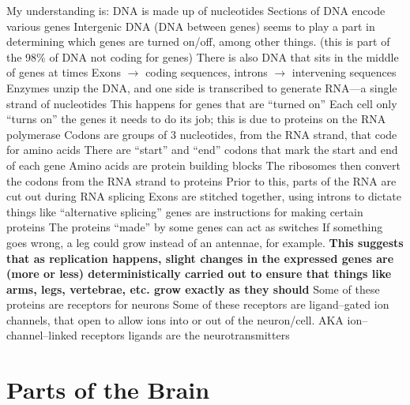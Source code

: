 \documentclass[11pt, a4paper, oneside]{article}   	%
\begin{document}
\begin{outline}
  \nopoint My understanding is:
  \point DNA is made up of nucleotides
  \point Sections of DNA encode various genes
    \subpoint Intergenic DNA (DNA between genes) seems to play a part in determining which genes are turned on/off, among other things. (this is part of the 98\% of DNA not coding for genes)
        \subsubpoint There is also DNA that sits in the middle of genes at times
            \supersubpoint Exons $\rightarrow$ coding sequences, introns $\rightarrow$ intervening sequences
  \point Enzymes unzip the DNA, and one side is transcribed to generate RNA---a single strand of nucleotides
    \subpoint This happens for genes that are ``turned on'' 
    \subpoint Each cell only ``turns on'' the genes it needs to do its job; this is due to proteins on the RNA polymerase
  \point Codons are groups of 3 nucleotides, from the RNA strand, that code for amino acids
    \subpoint There are ``start'' and ``end'' codons that mark the start and end of each gene
  \point Amino acids are protein building blocks
  \point The ribosomes then convert the codons from the RNA strand to proteins
    \subpoint Prior to this, parts of the RNA are cut out during RNA splicing
        \subsubpoint Exons are stitched together, using introns to dictate things like ``alternative splicing''
    \subpoint genes are instructions for making certain proteins
  \point The proteins ``made'' by some genes can act as switches
    \subpoint If something goes wrong, a leg could grow instead of an antennae, for example.
        \subsubpoint \textbf{This suggests that as replication happens, slight changes in the expressed genes are (more or less) deterministically carried out to ensure that things like arms, legs, vertebrae, etc. grow exactly as they should}
  \point Some of these proteins are receptors for neurons 
    \subpoint Some of these receptors are ligand--gated ion channels, that open to allow ions into or out of the neuron/cell.
        \subsubpoint AKA ion--channel--linked receptors
        \subsubpoint ligands are the neurotransmitters
    

  
\end{outline}


\section{Parts of the Brain}
\end{document}
